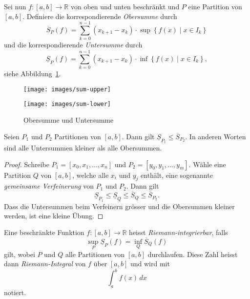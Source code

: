 \documentclass[../main.tex]{subfiles}
\begin{document}
Sei nun $f \colon [a, b] \to \mathbb{R}$ von oben und
unten beschränkt und $P$ eine Partition von $[a, b]$.
Definiere die korrespondierende \emph{Obersumme} durch
\[
  \overline S_P(f)
  = \sum_{k = 0}^{n - 1} (x_{k + 1} - x_k)
  \cdot \sup \left\{f(x) \mid x \in I_k \right\}
\]
und die korrespondierende \emph{Untersumme} durch
\[
  \underline S_P(f)
  = \sum_{k = 0}^{n - 1} (x_{k + 1} - x_k)
  \cdot \inf \left\{f(x) \mid x \in I_k \right\},
\]
siehe Abbildung~\ref{fig:riemann}.

\begin{figure}[htb]
  \centering
  \begin{minipage}{0.50\textwidth}
    \centering

    \texttt{[image: images/sum-upper]}
  \end{minipage}%
  \begin{minipage}{0.50\textwidth}
    \centering

    \texttt{[image: images/sum-lower]}
  \end{minipage}%
  \caption{Obersumme und Untersumme}%
  \label{fig:riemann}
\end{figure}

\begin{lemma*}
  Seien $P_1$ und $P_2$ Partitionen
  von $[a, b]$. Dann gilt
  $\underline S_{P_1} \leq \overline S_{P_2}$.
  In anderen Worten sind alle Untersummen
  kleiner als alle Obersummen.
\end{lemma*}

\begin{proof}
  Schreibe
  $P_1 = [x_0, x_1, \dots, x_n]$
  und
  $P_2 = [y_0, y_1, \dots, y_m]$.
  Wähle eine Partition $Q$ von
  $[a,b]$, welche alle $x_i$ und
  $y_j$ enthält, eine sogenannte
  \emph{gemeinsame Verfeinerung}
  von $P_1$ und $P_2$.
  Dann gilt
  \[
    \underline S_{P_1} \leq \underline S_Q
    \leq \overline S_Q
    \leq \overline S_{P_2}.
  \]
  Dass die Untersummen beim Verfeinern
  grösser und die Obersummen kleiner
  werden, ist eine kleine Übung.
\end{proof}

\begin{definition}
  Eine beschränkte Funktion
  $f \colon [a, b] \to \mathbb{R}$ heisst
  \emph{Riemann-integrierbar}, falls
  \[
    \sup_{P} \underline S_P(f) = \inf_{Q} \overline S_Q(f)
  \]
  gilt,
  wobei $P$ und $Q$ alle Partitionen von
  $[a, b]$ durchlaufen.
  Diese Zahl heisst dann \emph{Riemann-Integral}
  von $f$ über $[a,b]$ und wird
  mit
  \[
    \int_{a}^{b} f(x) \, dx
  \]
  notiert.
\end{definition}
\end{document}
